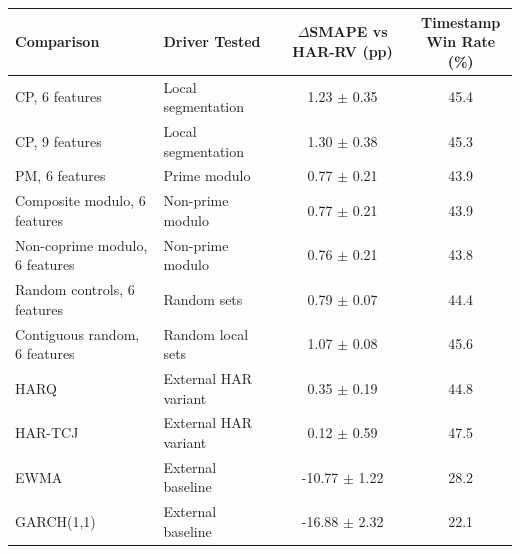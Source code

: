 \begin{tabular}{@{}llcc@{}}
\toprule
Comparison & Driver Tested & \shortstack{$\Delta$SMAPE\\vs HAR-RV (pp)} & \shortstack{Timestamp\\Win Rate (\%)} \\
\midrule
CP, 6 features & Local segmentation & 1.23 $\pm$ 0.35 & 45.4 \\
CP, 9 features & Local segmentation & 1.30 $\pm$ 0.38 & 45.3 \\
PM, 6 features & Prime modulo & 0.77 $\pm$ 0.21 & 43.9 \\
Composite modulo, 6 features & Non-prime modulo & 0.77 $\pm$ 0.21 & 43.9 \\
Non-coprime modulo, 6 features & Non-prime modulo & 0.76 $\pm$ 0.21 & 43.8 \\
Random controls, 6 features & Random sets & 0.79 $\pm$ 0.07 & 44.4 \\
Contiguous random, 6 features & Random local sets & 1.07 $\pm$ 0.08 & 45.6 \\
HARQ & External HAR variant & 0.35 $\pm$ 0.19 & 44.8 \\
HAR-TCJ & External HAR variant & 0.12 $\pm$ 0.59 & 47.5 \\
EWMA & External baseline & -10.77 $\pm$ 1.22 & 28.2 \\
GARCH(1,1) & External baseline & -16.88 $\pm$ 2.32 & 22.1 \\
\bottomrule
\end{tabular}
